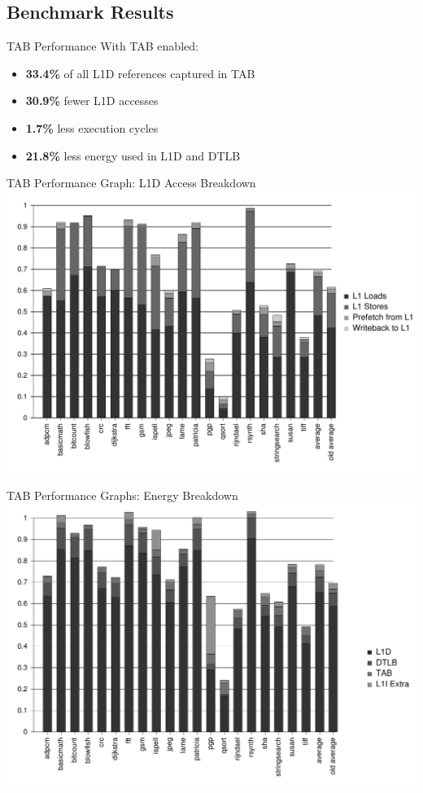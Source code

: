 \documentclass{beamer}
\begin{document}
\subsection{Benchmark Results}
\begin{frame}{TAB Performance}
   With TAB enabled:
   \begin{itemize}
      \item \textbf{33.4\%} of all L1D references captured in TAB
      \item \textbf{30.9\%} fewer L1D accesses
      \item \textbf{1.7\%} less execution cycles
      \item \textbf{21.8\%} less energy used in L1D and DTLB
   \end{itemize}
\end{frame}
\begin{frame}{TAB Performance Graph: L1D Access Breakdown}
   \includegraphics[width=\textwidth]{figures/dl1_access.pdf}
\end{frame}
\begin{frame}{TAB Performance Graphs: Energy Breakdown}
   \includegraphics[width=\textwidth]{figures/energy_e_stage.pdf}
\end{frame}
\end{document}
